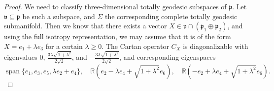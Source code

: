 \documentclass[11pt,a4paper,final]{amsart}
\newcommand{\g}{\mathfrak}
\newcommand{\R}{\mathbb{R}}
\newcommand{\vecspan}{\operatorname{span}}
\theoremstyle{definition}
\begin{document}
\begin{proof}
	We need to classify three-dimensional totally geodesic subspaces of $\g{p}$.
	Let $\g{v}\subseteq \g{p}$ be such a subspace, and $\Sigma$ the corresponding complete totally geodesic submanifold.
	Then we know that there exists a vector $X\in\g{v}\cap(\g{p}_{1}\oplus\g{p}_{2})$, and using the full isotropy representation, we may assume that it is of the form $X=e_{1}+\lambda e_{3}$ for a certain $\lambda \geq 0$.
	The Cartan operator $C_{X}$ is diagonalizable with eigenvalues $0$, $\frac{3\lambda\sqrt{1+\lambda^{2}}}{2\sqrt{2}}$, and $-\frac{3\lambda\sqrt{1+\lambda^{2}}}{2\sqrt{2}}$, and corresponding eigenspaces
	\[
		\vecspan\{e_{1},e_{3},e_{5},\lambda e_{2}+e_{4}\},\quad \R\left(e_{2}-\lambda e_{4}+\sqrt{1+\lambda^{2}}e_{6}\right), \quad \R\left(-e_{2}+\lambda e_{4}+\sqrt{1+\lambda^{2}}e_{6}\right).
	\]
		

\end{proof}
\end{document}
